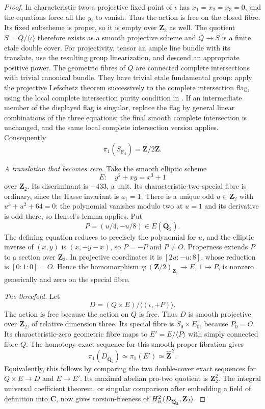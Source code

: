 \begin{proof}
In characteristic two a projective fixed point of $\iota$ has
$x_1=x_2=x_3=0$, and the equations force all the $y_i$ to vanish.
Thus the action is free on the closed fibre.  Its fixed subscheme is
proper, so it is empty over $\mathbf Z_2$ as well.  The quotient
$S=Q/\langle\iota\rangle$ therefore exists as a smooth projective
scheme and $Q\to S$ is a finite etale double cover.  For projectivity,
tensor an ample line bundle with its translate, use the resulting
group linearization, and descend an appropriate positive power.
The geometric fibres of $Q$ are connected complete intersections
with trivial canonical bundle.  They have trivial etale fundamental
group: apply the projective Lefschetz theorem successively to the
complete intersection flag, using the local complete intersection
purity condition in \citet[Expos\'e XII, Corollary 3.5]{SGA2}.
If an intermediate member of the displayed flag is singular, replace
the flag by general linear combinations of the three equations;
the final smooth complete intersection is unchanged, and the same
local complete intersection version applies.  Consequently
\[
 \pi_1(S_{\overline{\mathbf F}_2})=\mathbf Z/2\mathbf Z.
\]

\emph{A translation that becomes zero.}
Take the smooth elliptic scheme
\[
 E:\quad y^2+xy=x^3+1
\]
over $\mathbf Z_2$.  Its discriminant is $-433$, a unit.  Its
characteristic-two special fibre is ordinary, since the Hasse
invariant is $a_1=1$.  There is a unique odd $u\in\mathbf Z_2$ with
$u^3+u^2+64=0$: the polynomial vanishes modulo two at $u=1$ and its
derivative is odd there, so Hensel's lemma applies.  Put
\[
 P=(u/4,-u/8)\in E(\mathbf Q_2).
\]
The defining equation reduces to precisely the polynomial for $u$,
and the elliptic inverse of $(x,y)$ is $(x,-y-x)$, so $P=-P$ and
$P\ne O$.  Properness extends $P$ to a section over $\mathbf Z_2$.
In projective coordinates it is $[2u:-u:8]$, whose reduction is
$[0:1:0]=O$.  Hence the homomorphism
$\eta:(\mathbf Z/2)_{\mathbf Z_2}\to E$, $1\mapsto P$, is nonzero
generically and zero on the special fibre.

\emph{The threefold.}
Let
\[
 D=(Q\times E)/\langle(\iota,+P)\rangle.
\]
The action is free because the action on $Q$ is free.  Thus $D$ is
smooth projective over $\mathbf Z_2$, of relative dimension three.
Its special fibre is $S_0\times E_0$, because $P_0=O$.
Its characteristic-zero geometric fibre maps to
$E'=E/\langle P\rangle$ with simply connected fibre $Q$.
The homotopy exact sequence for this smooth proper fibration gives
\[
 \pi_1(D_{\overline{\mathbf Q}_2})\simeq\pi_1(E')\simeq
 \widehat{\mathbf Z}^{\,2}.
\]
Equivalently, this follows by comparing the two double-cover exact
sequences for $Q\times E\to D$ and $E\to E'$.
Its maximal abelian pro-two quotient is $\mathbf Z_2^2$.
The integral universal coefficient theorem, or singular comparison
after embedding a field of definition into $\mathbf C$, now gives
torsion-freeness of $H^2_{\et}(D_{\overline{\mathbf Q}_2},\mathbf Z_2)$.


\end{proof}

